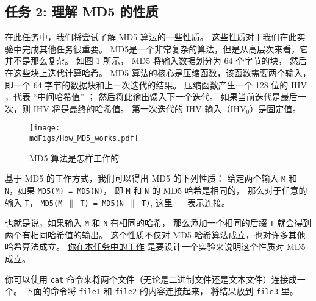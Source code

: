 



\subsection{任务 2: 理解 MD5 的性质}


在此任务中，我们将尝试了解 MD5 算法的一些性质。
这些性质对于我们在此实验中完成其他任务很重要。
MD5是一个非常复杂的算法，但是从高层次来看，它并不是那么复杂。
如图 \ref{md5:fig:how_md5_works} 所示， MD5 将输入数据划分为 64 个字节的块，
然后在这些块上迭代计算哈希。
MD5 算法的核心是压缩函数，该函数需要两个输入，即一个 64 字节的数据块和上一次迭代的结果。
压缩函数产生一个 128 位的 IHV ，代表 ``中间哈希值'' ； 然后将此输出馈入下一个迭代。
如果当前迭代是最后一次，则 IHV 将是最终的哈希值。
第一次迭代的 IHV 输入（IHV$_0$）是固定值。


\begin{figure}[htb]
	\centering
	\texttt{[image: \\mdFigs/How\_MD5\_works.pdf]}
	\caption{MD5 算法是怎样工作的}
	\label{md5:fig:how_md5_works}
\end{figure}


基于 MD5 的工作方式，我们可以得出 MD5 的下列性质：
给定两个输入 \texttt{M} 和 \texttt{N}，如果 \texttt{MD5(M) = MD5(N)}，
即 \texttt{M} 和 \texttt{N} 的 MD5 哈希是相同的，
那么对于任意的输入 \texttt{T}， \texttt{MD5(M $\|$ T) = MD5(N $\|$ T)},
这里 \texttt{$\|$} 表示连接。

也就是说，如果输入 \texttt{M} 和 \texttt{N} 有相同的哈希，
那么添加一个相同的后缀 \texttt{T} 就会得到两个有相同哈希值的输出。
这个性质不仅对 MD5 哈希算法成立，也对许多其他哈希算法成立。
\underline{你在本任务中的工作} 是要设计一个实验来说明这个性质对 MD5 成立。


你可以使用 \texttt{cat} 命令来将两个文件（无论是二进制文件还是文本文件）连接成一个。
下面的命令将 \texttt{file1} 和 \texttt{file2} 的内容连接起来，
将结果放到 \texttt{file3} 里。


